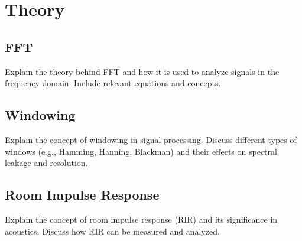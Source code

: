 \chapter{Theory}


\section{FFT} 

Explain the theory behind FFT and how it is used to analyze signals in the frequency domain. Include relevant equations and concepts.

\section{Windowing}

Explain the concept of windowing in signal processing. Discuss different types of windows (e.g., Hamming, Hanning, Blackman) and their effects on spectral leakage and resolution.

\section{Room Impulse Response}

Explain the concept of room impulse response (RIR) and its significance in acoustics. Discuss how RIR can be measured and analyzed.




